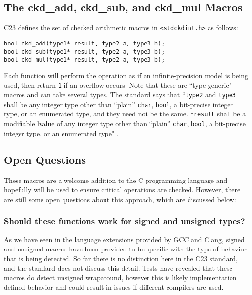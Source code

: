 \subsection{The ckd\_add, ckd\_sub, and ckd\_mul Macros}

C23 defines the set of checked arithmetic macros in \texttt{<stdckdint.h>} as follows:

\begin{flushleft}
\texttt{bool ckd\_add(type1* result, type2 a, type3 b);}\\
\texttt{bool ckd\_sub(type1* result, type2 a, type3 b);}\\
\texttt{bool ckd\_mul(type1* result, type2 a, type3 b);}
\end{flushleft}

Each function will perform the operation as if an infinite-precision model is being used, then return \texttt{1} if an overflow occurs. Note that these are ``type-generic" macros and can take several types. The standard says that ``\texttt{type2} and \texttt{type3} shall be any integer type other than ``plain” \texttt{char}, \texttt{bool}, a bit-precise integer type, or an enumerated type, and they need not be the same. \texttt{*result} shall be a modifiable lvalue of any integer type other than ``plain” \texttt{char}, \texttt{bool}, a bit-precise integer type, or an enumerated type" \cite{ckd_arith}.

\subsection{Open Questions}

These macros are a welcome addition to the C programming language and hopefully will be used to ensure critical operations are checked. However, there are still some open questions about this approach, which are discussed below:

\subsubsection{Should these functions work for signed and unsigned types?}
As we have seen in the language extensions provided by GCC and Clang, signed and unsigned macros have been provided to be specific with the type of behavior that is being detected. So far there is no distinction here in the C23 standard, and the standard does not discuss this detail. Tests have revealed that these macros do detect unsigned wraparound, however this is likely implementation defined behavior and could result in issues if different compilers are used.

